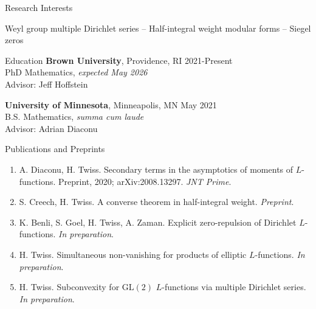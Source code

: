 \documentclass{resume} %
\begin{document}
\begin{rSection}{Research Interests}
    \begin{center}Weyl group multiple Dirichlet series -- Half-integral weight modular forms -- Siegel zeros\end{center}
\end{rSection}

\begin{rSection}{Education}
    {\bf Brown University}, Providence, RI \hfill {2021-Present} \\
    PhD Mathematics, \textit{expected May 2026} \\
    \hphantom{\quad}Advisor: Jeff Hoffstein

    {\bf University of Minnesota}, Minneapolis, MN \hfill {May 2021} \\
    B.S. Mathematics, \textit{summa cum laude} \\
    \hphantom{\quad}Advisor: Adrian Diaconu
\end{rSection}

\begin{rSection}{Publications and Preprints}
    \begin{enumerate}
        \item {A. Diaconu, H. Twiss. Secondary terms in the asymptotics of moments of $L$-functions. Preprint,
        2020; arXiv:2008.13297. \textit{JNT Prime}.}
        \item {S. Creech, H. Twiss. A converse theorem in half-integral weight. \textit{Preprint}.}
        \item {K. Benli, S. Goel, H. Twiss, A. Zaman. Explicit zero-repulsion of Dirichlet $L$-functions. \textit{In preparation}.}
        \item {H. Twiss. Simultaneous non-vanishing for products of elliptic $L$-functions. \textit{In preparation}.}
        \item {H. Twiss. Subconvexity for $\mathrm{GL}(2)$ $L$-functions via multiple Dirichlet series. \textit{In preparation}.}
    \end{enumerate}
\end{rSection}
\end{document}
